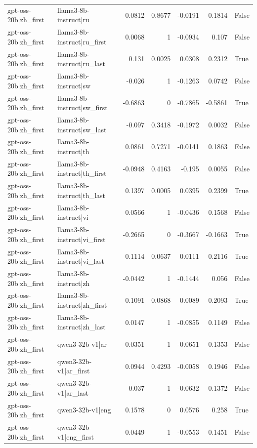 \begin{table}
\begin{tabular}{l l r r r r l}
gpt-oss-20b|zh_first & llama3-8b-instruct|ru & 0.0812 & 0.8677 & -0.0191 & 0.1814 & False \\
gpt-oss-20b|zh_first & llama3-8b-instruct|ru_first & 0.0068 & 1 & -0.0934 & 0.107 & False \\
gpt-oss-20b|zh_first & llama3-8b-instruct|ru_last & 0.131 & 0.0025 & 0.0308 & 0.2312 & True \\
gpt-oss-20b|zh_first & llama3-8b-instruct|sw & -0.026 & 1 & -0.1263 & 0.0742 & False \\
gpt-oss-20b|zh_first & llama3-8b-instruct|sw_first & -0.6863 & 0 & -0.7865 & -0.5861 & True \\
gpt-oss-20b|zh_first & llama3-8b-instruct|sw_last & -0.097 & 0.3418 & -0.1972 & 0.0032 & False \\
gpt-oss-20b|zh_first & llama3-8b-instruct|th & 0.0861 & 0.7271 & -0.0141 & 0.1863 & False \\
gpt-oss-20b|zh_first & llama3-8b-instruct|th_first & -0.0948 & 0.4163 & -0.195 & 0.0055 & False \\
gpt-oss-20b|zh_first & llama3-8b-instruct|th_last & 0.1397 & 0.0005 & 0.0395 & 0.2399 & True \\
gpt-oss-20b|zh_first & llama3-8b-instruct|vi & 0.0566 & 1 & -0.0436 & 0.1568 & False \\
gpt-oss-20b|zh_first & llama3-8b-instruct|vi_first & -0.2665 & 0 & -0.3667 & -0.1663 & True \\
gpt-oss-20b|zh_first & llama3-8b-instruct|vi_last & 0.1114 & 0.0637 & 0.0111 & 0.2116 & True \\
gpt-oss-20b|zh_first & llama3-8b-instruct|zh & -0.0442 & 1 & -0.1444 & 0.056 & False \\
gpt-oss-20b|zh_first & llama3-8b-instruct|zh_first & 0.1091 & 0.0868 & 0.0089 & 0.2093 & True \\
gpt-oss-20b|zh_first & llama3-8b-instruct|zh_last & 0.0147 & 1 & -0.0855 & 0.1149 & False \\
gpt-oss-20b|zh_first & qwen3-32b-v1|ar & 0.0351 & 1 & -0.0651 & 0.1353 & False \\
gpt-oss-20b|zh_first & qwen3-32b-v1|ar_first & 0.0944 & 0.4293 & -0.0058 & 0.1946 & False \\
gpt-oss-20b|zh_first & qwen3-32b-v1|ar_last & 0.037 & 1 & -0.0632 & 0.1372 & False \\
gpt-oss-20b|zh_first & qwen3-32b-v1|eng & 0.1578 & 0 & 0.0576 & 0.258 & True \\
gpt-oss-20b|zh_first & qwen3-32b-v1|eng_first & 0.0449 & 1 & -0.0553 & 0.1451 & False \\

\end{tabular}
\end{table}
